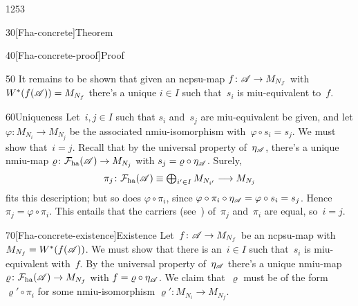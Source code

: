 \begin{parsec}{1253}
\begin{point}{30}[Fha-concrete]{Theorem}
\begin{point}{40}[Fha-concrete-proof]{Proof}
\begin{point}{50}
It remains to be shown
that given an ncpsu-map
$f\colon \mathscr{A}\to M_{N_f}$
    with $W^*(f(\mathscr{A}))= M_{N_f}$
there's a unique $i\in I$
such that~$s_i$ is miu-equivalent to~$f$.
\end{point}
\begin{point}{60}{Uniqueness}%
Let~$i,j\in I$ such that $s_i$ and~$s_j$ are miu-equivalent
be given, 
and let $\varphi\colon M_{N_i}\to M_{N_j}$
be the associated nmiu-isomorphism with~$\varphi \circ s_i = s_j$.
We must show that~$i=j$.
Recall that by the universal property of~$\eta_{\mathscr{A}}$,
there's a unique
nmiu-map $\varrho\colon \mathcal{F}_\mathrm{ha}(\mathscr{A})
\to M_{N_j}$
with $s_j = \varrho\circ \eta_{\mathscr{A}}$.
    Surely, 
\begin{equation*} 
    \textstyle
    \pi_j\colon \mathcal{F}_\mathrm{ha}(\mathscr{A})
    \equiv \bigoplus_{i'\in I}  M_{N_{i'}}
    \longrightarrow M_{N_j}
\end{equation*}
fits this description;
but so does $\varphi\circ \pi_i$,
since $\varphi\circ \pi_i \circ \eta_{\mathscr{A}} = \varphi\circ s_i = s_j$.
Hence~$\pi_j = \varphi\circ \pi_i$.
    This entails that the carriers (see~) 
    of~$\pi_j$ and~$\pi_i$
are equal, so~$i=j$.
\begin{point}{70}[Fha-concrete-existence]{Existence}
Let~$f\colon \mathscr{A}\to M_{N_f}$
be an ncpsu-map with $M_{N_f}=W^*(f(\mathscr{A}))$.
We must show that there is an~$i\in I$
such that~$s_i$
is miu-equivalent with~$f$.
By the universal property of~$\eta_{\mathscr{A}}$
there's a unique nmiu-map $\varrho\colon \mathcal{F}_\mathrm{ha}(\mathscr{A})
\to M_{N_f}$ with $f = \varrho\circ \eta_{\mathscr{A}}$.
We claim that~$\varrho$ must be of the form~$\varrho'\circ \pi_i$
for some nmiu-isomorphism $\varrho'\colon M_{N_i}\to M_{N_f}$.


\end{point}
\end{point}
\end{point}
\end{point}
\end{parsec}
